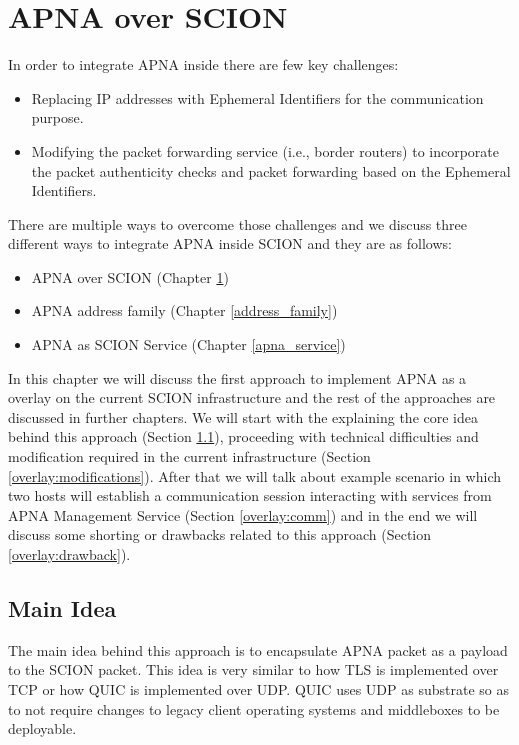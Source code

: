 
\chapter{APNA over SCION} %

\label{apna_overlay}
In order to integrate APNA inside there are few key challenges:
\begin{itemize}
    \item Replacing IP addresses with Ephemeral Identifiers for the communication purpose. 
    \item Modifying the packet forwarding service (i.e., border routers) to incorporate the packet authenticity checks and packet forwarding based on the Ephemeral Identifiers.
\end{itemize}

There are multiple ways to overcome those challenges and we discuss three different ways to integrate APNA inside SCION and they are as follows:
\begin{itemize}
    \item APNA over SCION (Chapter \ref{apna_overlay})
    \item APNA address family (Chapter \ref{address_family})
    \item APNA as SCION Service (Chapter \ref{apna_service})
\end{itemize}

In this chapter we will discuss the first approach to implement APNA as a overlay on the current SCION infrastructure and the rest of the approaches are discussed in further chapters. We will start with the explaining the core idea behind this approach (Section \ref{overlay:main_idea}), proceeding with technical difficulties and modification required in the current infrastructure (Section \ref{overlay:modifications}). After that we will talk about example scenario in which two hosts will establish a communication session interacting with services from APNA Management Service (Section \ref{overlay:comm}) and in the end we will discuss some shorting or drawbacks related to this approach (Section \ref{overlay:drawback}).

\section{Main Idea} \label{overlay:main_idea}

The main idea behind this approach is to encapsulate APNA packet as a payload to the SCION packet. This idea is very similar to how TLS is implemented over TCP or how QUIC is implemented over UDP.  QUIC uses UDP as substrate so as to not require changes to legacy client operating systems and middleboxes to be deployable.

